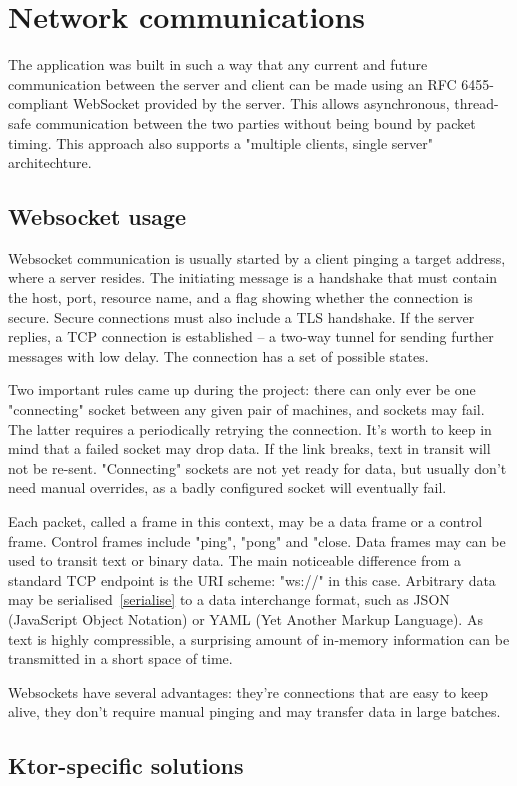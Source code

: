 \chapter{Network communications}
The application was built in such a way that any current and future communication between the server and client can be made using an RFC 6455-compliant\cite{RFC6455} WebSocket provided by the server. This allows asynchronous, thread-safe communication between the two parties without being bound by packet timing. This approach also supports a "multiple clients, single server" architechture.

\section{Websocket usage}
Websocket communication is usually started by a client pinging a target address, where a server resides. The initiating message is a handshake that must contain the host, port, resource name, and a flag showing whether the connection is secure. Secure connections must also include a TLS handshake. If the server replies, a TCP connection is established -- a two-way tunnel for sending further messages with low delay. The connection has a set of possible states.

Two important rules came up during the project: there can only ever be one "connecting" socket between any given pair of machines, and sockets may fail. The latter requires a periodically retrying the connection. It's worth to keep in mind that a failed socket may drop data. If the link breaks, text in transit will not be re-sent. "Connecting" sockets are not yet ready for data, but usually don't need manual overrides, as a badly configured socket will eventually fail.

Each packet, called a frame in this context, may be a data frame or a control frame. Control frames include "ping", "pong" and "close. Data frames may can be used to transit text or binary data. The main noticeable difference from a standard TCP endpoint is the URI scheme: "ws://" in this case. Arbitrary data may be serialised~\ref{serialise} to a data interchange format, such as JSON (JavaScript Object Notation) or YAML (Yet Another Markup Language). As text is highly compressible, a surprising amount of in-memory information can be transmitted in a short space of time.

Websockets have several advantages: they're connections that are easy to keep alive, they don't require manual pinging and may transfer data in large batches.

\section{Ktor-specific solutions}